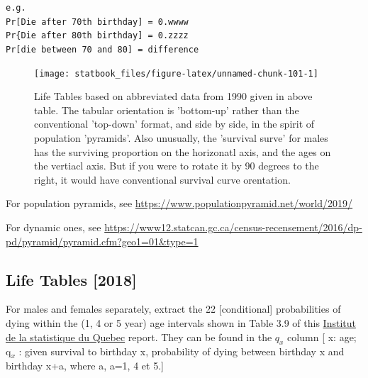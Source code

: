 \documentclass[]{book}
\begin{document}
\texttt{e.g.}\\
\texttt{Pr{[}Die\ after\ 70th\ birthday{]}\ =\ 0.wwww}~\\
\texttt{Pr\{Die\ after\ 80th\ birthday{]}\ =\ 0.zzzz}~\\
\texttt{Pr{[}die\ between\ 70\ and\ 80{]}\ =\ difference}

\begin{figure}

{\centering \texttt{[image: statbook\_files/figure-latex/unnamed-chunk-101-1]} 

}

\caption{Life Tables based on abbreviated data from 1990 given in above table. The tabular orientation is 'bottom-up' rather than the conventional 'top-down' format, and side by side, in the spirit of population 'pyramids'. Also unusually, the 'survival surve' for males has the surviving proportion on the horizonatl axis, and the ages on the vertiacl axis. But if you were to rotate it by 90 degrees to the right, it would have conventional survival curve orentation.  }\label{fig:unnamed-chunk-101}
\end{figure}

For population pyramids, see \url{https://www.populationpyramid.net/world/2019/}

For dynamic ones, see
\url{https://www12.statcan.gc.ca/census-recensement/2016/dp-pd/pyramid/pyramid.cfm?geo1=01\&type=1}

\hypertarget{life-tables-2018}{%
\subsection{Life Tables {[}2018{]}}\label{life-tables-2018}}

For males and females separately, extract the 22 {[}conditional{]} probabilities of dying within the (1, 4 or 5 year) age intervals shown in Table 3.9 of this \href{https://www.stat.gouv.qc.ca/statistiques/population-demographie/bilan2019.pdf\#page=55}{Institut de la statistique du Quebec} report. They can be found in the \(q_x\) column {[} x: age;
q\(_x\) : given survival to birthday x, probability of dying between birthday x and birthday x+a, where a, a=1, 4 et 5.{]}
\end{document}
